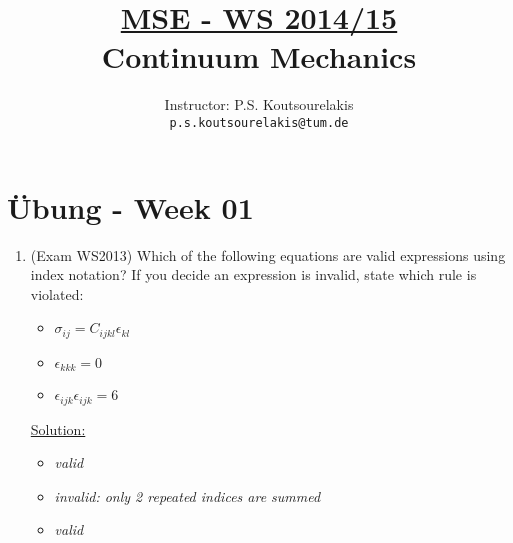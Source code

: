 \documentclass{article}
\title{\underline{MSE - WS 2014/15}\\
Continuum Mechanics}
\author{
Instructor: P.S. Koutsourelakis  \\
\texttt{p.s.koutsourelakis@tum.de} \\
}
\newcommand{\bi}{\begin{itemize}}
\newcommand{\ei}{\end{itemize}}
\begin{document}
\makeanontitle

%

\section*{\"Ubung - Week 01}


\begin{enumerate}

\item (Exam WS2013) Which of the following equations are valid expressions using index notation? If you decide an expression is invalid, state which rule is violated:
\bi
\item $\sigma_{ij}=C_{ijkl} \epsilon_{kl}$
\item $\epsilon_{kkk}=0$
\item $\epsilon_{ijk}\epsilon_{ijk}=6$
\ei

\underline{Solution:}
\bi
\item {} \textit{valid}
\item {} \textit{invalid: only 2 repeated indices are summed}
\item {} \textit{valid}
\ei


\end{enumerate}
\end{document}
